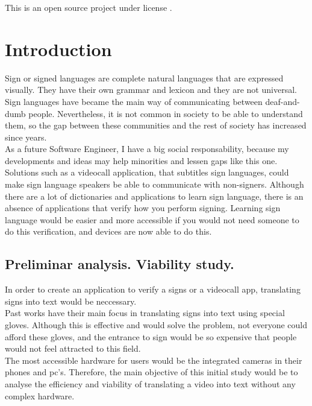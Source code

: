 This is an open source project under license \cite{gplv3}. \\

\chapter{Introduction}

Sign or signed languages are complete natural languages that are expressed visually.
They have their own grammar and lexicon and they are not universal. \\ 

Sign languages have became the main way of communicating between deaf-and-dumb people. Nevertheless,
it is not common in society to be able to understand them, so the gap between these communities
and the rest of society has increased since years. \\

As a future Software Engineer, I have a big social responsability, because my developments and ideas
may help minorities and lessen gaps like this one. \\

Solutions such as a videocall application, that subtitles sign languages, could make sign language 
speakers be able to communicate with non-signers.
Although there are a lot of dictionaries and applications to learn sign language, there is an 
absence of applications that verify how you perform signing.
Learning sign language would be easier and more accessible if you would not need someone to do this verification,
and devices are now able to do this.

\section{Preliminar analysis. Viability study.}

In order to create an application to verify a signs or a videocall app, 
translating signs into text would be neccessary. \\

Past works have their main focus in translating signs into text using special gloves. Although this is effective 
and would solve the problem, not everyone could afford these gloves, and the entrance to sign would be so expensive 
that people would not feel attracted to this field. \\

The most accessible hardware for users would be the integrated cameras in their phones and pc's. Therefore,
the main objective of this initial study would be to analyse the efficiency and viability of translating 
a video into text without any complex hardware.

